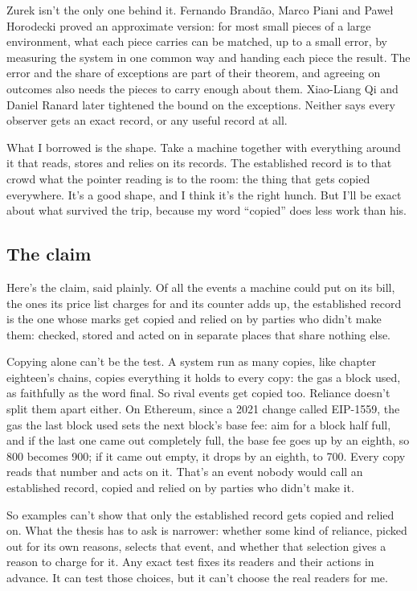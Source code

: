 \documentclass[11pt,twoside]{article}
\theoremstyle{thielethm}
\theoremstyle{thieledef}
\theoremstyle{thieledef}
\theoremstyle{thieledef}
\theoremstyle{thielethm}
\theoremstyle{thieleobs}
\theoremstyle{thielethm}
\begin{document}
Zurek isn't the only one behind it. Fernando Brandão, Marco Piani and Paweł Horodecki proved an approximate version: for most small pieces of a large environment, what each piece carries can be matched, up to a small error, by measuring the system in one common way and handing each piece the result. The error and the share of exceptions are part of their theorem, and agreeing on outcomes also needs the pieces to carry enough about them. Xiao-Liang Qi and Daniel Ranard later tightened the bound on the exceptions. Neither says every observer gets an exact record, or any useful record at all.

What I borrowed is the shape. Take a machine together with everything around it that reads, stores and relies on its records. The established record is to that crowd what the pointer reading is to the room: the thing that gets copied everywhere. It's a good shape, and I think it's the right hunch. But I'll be exact about what survived the trip, because my word ``copied'' does less work than his.

\subsection{The claim}

Here's the claim, said plainly. Of all the events a machine could put on its bill, the ones its price list charges for and its counter adds up, the established record is the one whose marks get copied and relied on by parties who didn't make them: checked, stored and acted on in separate places that share nothing else.

Copying alone can't be the test. A system run as many copies, like chapter eighteen's chains, copies everything it holds to every copy: the gas a block used, as faithfully as the word final. So rival events get copied too. Reliance doesn't split them apart either. On Ethereum, since a 2021 change called EIP-1559, the gas the last block used sets the next block's base fee: aim for a block half full, and if the last one came out completely full, the base fee goes up by an eighth, so 800 becomes 900; if it came out empty, it drops by an eighth, to 700. Every copy reads that number and acts on it. That's an event nobody would call an established record, copied and relied on by parties who didn't make it.

So examples can't show that only the established record gets copied and relied on. What the thesis has to ask is narrower: whether some kind of reliance, picked out for its own reasons, selects that event, and whether that selection gives a reason to charge for it. Any exact test fixes its readers and their actions in advance. It can test those choices, but it can't choose the real readers for me.
\end{document}

